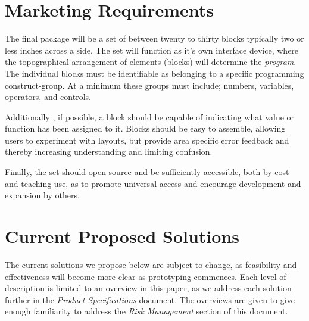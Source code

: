 \section{Marketing Requirements}


The final package will be a set of between twenty to thirty blocks typically two or less inches across a side. The set will function as it's own interface device, where the topographical arrangement of elements (blocks) will determine the \textit{program}. The individual blocks must be identifiable as belonging to a specific programming construct-group. At a minimum these groups must include; numbers, variables, operators, and controls.

Additionally , if possible, a block should be capable of indicating what  value or function has been  assigned to it. Blocks should be easy to assemble,  allowing users to experiment with layouts, but provide area specific error feedback and thereby increasing understanding and limiting confusion.

Finally, the set should open source and be sufficiently accessible, both by cost and teaching use, as to promote universal access and encourage development and expansion by others.




\section{Current Proposed Solutions }
  The current solutions we propose below are subject to change, as feasibility and effectiveness will become more clear as prototyping commences. Each level of description is limited to an overview in this paper, as we address each solution further in the \textit{Product  Specifications} document. The overviews are given to give enough familiarity to address the \textit{Risk Management} section of this document.

